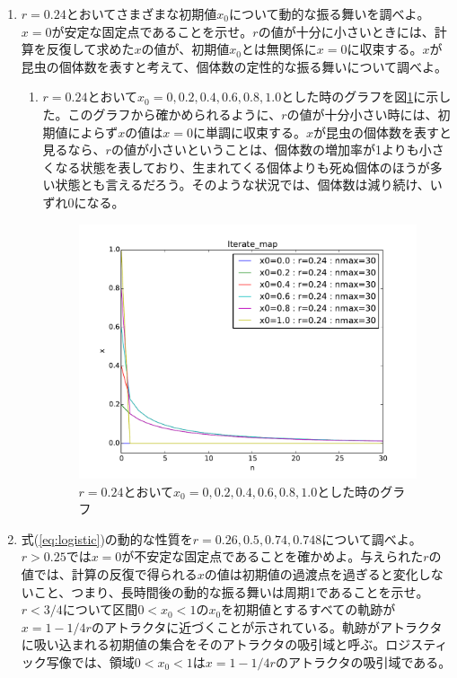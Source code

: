 \documentclass{jsarticle}
\begin{document}
\begin{enumerate}
 \renewcommand{\labelenumi}{\alph{enumi}.}
 \renewcommand{\labelenumii}{}

 \item $r=0.24$とおいてさまざまな初期値$x_{0}$について動的な振る舞いを調べよ。$x=0$が安定な固定点であることを示せ。$r$の値が十分に小さいときには、計算を反復して求めた$x$の値が、初期値$x_{0}$とは無関係に$x=0$に収束する。$x$が昆虫の個体数を表すと考えて、個体数の定性的な振る舞いについて調べよ。
 
  \begin{enumerate}
   \item $r=0.24$とおいて$x_{0}=0, 0.2, 0.4, 0.6, 0.8, 1.0 $とした時のグラフを図\ref{fig:f1}に示した。このグラフから確かめられるように、$r$の値が十分小さい時には、初期値によらず$x$の値は$x=0$に単調に収束する。$x$が昆虫の個体数を表すと見るなら、$r$の値が小さいということは、個体数の増加率が1よりも小さくなる状態を表しており、生まれてくる個体よりも死ぬ個体のほうが多い状態とも言えるだろう。そのような状況では、個体数は減り続け、いずれ0になる。
   \begin{figure}[htbp]
    \begin{center}
    \includegraphics[width=14.0cm]{figure_1.pdf}
    \caption{$r=0.24$とおいて$x_{0}=0, 0.2, 0.4, 0.6, 0.8, 1.0 $とした時のグラフ}
    \label{fig:f1}
    \end{center}
    \end{figure}
   \end{enumerate}
  
 \item 式(\ref{eq:logistic})の動的な性質を$r=0.26, 0.5, 0.74, 0.748$について調べよ。$r > 0.25$では$x=0$が不安定な固定点であることを確かめよ。与えられた$r$の値では、計算の反復で得られる$x$の値は初期値の過渡点を過ぎると変化しないこと、つまり、長時間後の動的な振る舞いは周期1であることを示せ。$r < 3/4$について区間$0 < x_{0} < 1$の$x_{0}$を初期値とするすべての軌跡が$x=1-1/4r$のアトラクタに近づくことが示されている。軌跡がアトラクタに吸い込まれる初期値の集合をそのアトラクタの吸引域と呼ぶ。ロジスティック写像では、領域$0 < x_{0} < 1$は$x=1-1/4r$のアトラクタの吸引域である。
 

\end{enumerate}
\end{document}
